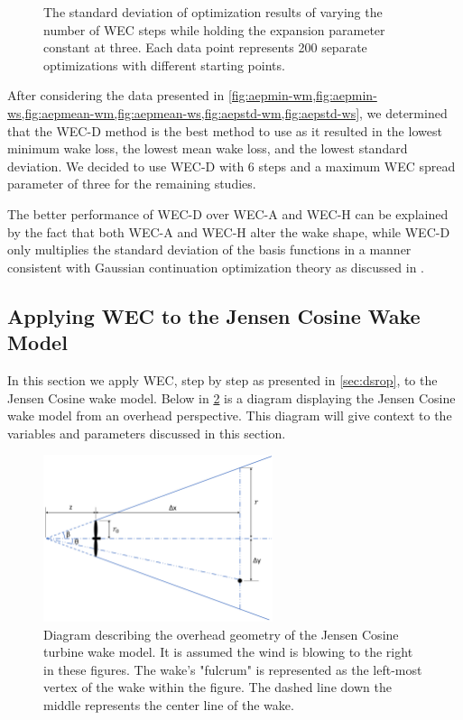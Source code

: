 \documentclass[a4paper]{jpconf}
\begin{document}
\begin{figure}[ht]
\begin{minipage}[t]{0.47\textwidth}
		\caption{The standard deviation of optimization results of varying the number of WEC steps while holding the expansion parameter constant at three. Each data point represents 200 separate optimizations with different starting points.}
		\label{fig:aepstd-ws}
	\end{minipage}
\end{figure}

 After considering the data presented in \cref{fig:aepmin-wm,fig:aepmin-ws,fig:aepmean-wm,fig:aepmean-ws,fig:aepstd-wm,fig:aepstd-ws}, we determined that the WEC-D method is the best method to use as it resulted in the lowest minimum wake loss, the lowest mean wake loss, and the lowest standard deviation. We decided to use WEC-D with 6 steps and a maximum WEC spread parameter of three for the remaining studies.
 
 The better performance of WEC-D over WEC-A and WEC-H can be explained by the fact that both WEC-A and WEC-H alter the wake shape, while WEC-D only multiplies the standard deviation of the basis functions in a manner consistent with Gaussian continuation optimization theory as discussed in \cite{mobahi2015}.
 
\subsection{Applying WEC to the Jensen Cosine Wake Model}
In this section we apply WEC, step by step as presented in \cref{sec:dsrop}, to the Jensen Cosine wake model. Below in \cref{fig:JensenDiagrams} is a diagram displaying the Jensen Cosine wake model from an overhead perspective. This diagram will give context to the variables and parameters discussed in this section.

\begin{figure}[h]
	\centering
	\includegraphics[width=0.6\textwidth]{JensenDiagramNew}
	\caption{Diagram describing the overhead geometry of the Jensen Cosine turbine wake model. It is assumed the wind is blowing to the right in these figures. The wake's "fulcrum" is represented as the left-most vertex of the wake within the figure. The dashed line down the middle represents the center line of the wake.}
	\label{fig:JensenDiagrams}
\end{figure}
\end{document}

